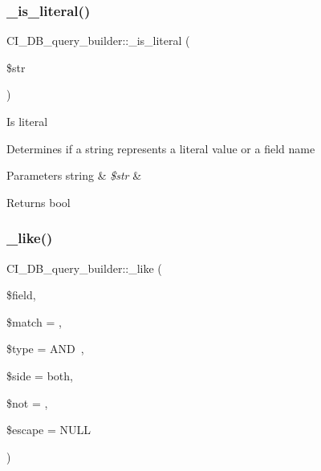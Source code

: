 \subsubsection{\texorpdfstring{\+\_\+is\+\_\+literal()}{\_is\_literal()}}
{\footnotesize\ttfamily C\+I\+\_\+\+D\+B\+\_\+query\+\_\+builder\+::\+\_\+is\+\_\+literal (\begin{DoxyParamCaption}\item[{}]{\$str }\end{DoxyParamCaption})\hspace{0.3cm}{\ttfamily [protected]}}

Is literal

Determines if a string represents a literal value or a field name


\begin{DoxyParams}[1]{Parameters}
string & {\em \$str} & \\
\hline
\end{DoxyParams}
\begin{DoxyReturn}{Returns}
bool 
\end{DoxyReturn}
\mbox{\label{class_c_i___d_b__query__builder_aa084a245f6732555abd55b00ab73713a}} 
\subsubsection{\texorpdfstring{\+\_\+like()}{\_like()}}
{\footnotesize\ttfamily C\+I\+\_\+\+D\+B\+\_\+query\+\_\+builder\+::\+\_\+like (\begin{DoxyParamCaption}\item[{}]{\$field,  }\item[{}]{\$match = {\ttfamily \textquotesingle{}\textquotesingle{}},  }\item[{}]{\$type = {\ttfamily \textquotesingle{}AND~\textquotesingle{}},  }\item[{}]{\$side = {\ttfamily \textquotesingle{}both\textquotesingle{}},  }\item[{}]{\$not = {\ttfamily \textquotesingle{}\textquotesingle{}},  }\item[{}]{\$escape = {\ttfamily NULL} }\end{DoxyParamCaption})\hspace{0.3cm}{\ttfamily [protected]}}

